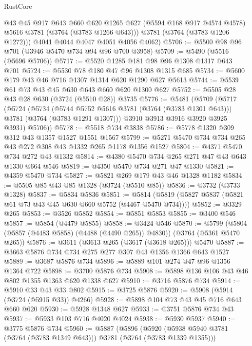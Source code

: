 \begin{lexlean}{RustCore}
\begin{coremodule}
          @43
          @45
          @917
          @643
          @660
          @620
          @1265
          @627
          (@5594 @168 @917 @4574 @4578)
          @5616
          @3781
          (@3764 (@3783 @1266 @643)))
        @3781
        (@3764 (@3783 @1206 @1272)))
      @4041
      @4044
      @4047
      @4051
      @4056
      @4062)
@5706 := @5500 @98 @96 @701 (@3946 @5470 @734 @94 @96 @700 @3958)
@5709 := @5490 (@5516 (@5696 @5706))
@5717 := @5520 @1285 @181 @98 @96 @1308 @1317 @643 @701
@5724 := @5530 @78 @180 @47 @96 @1308 @1315 @685
@5734 := @5600 @179 @43 @46 @716 @1307 @1314 @620 @1290 @627 @5613
@5744 := @5539 @61 @73 @43 @45 @630 @643 @660 @620 @1300 @627
@5752 := @5505 @28 @43 @28 @630 (@3724 (@5510 @28)) @3735
@5776 := @5481
    (@5709
      (@5717
        (@5724
          (@5734
            (@5744 @5752 @5616 @3781 (@3764 (@3783 @1301 @643)))
            @3781
            (@3764 (@3783 @1291 @1307)))
          @3910
          @3913
          @3916
          @3920
          @3925
          @3931)
        @5706))
@5778 := @5518 @734 @3838
@5786 := @5778 @1320 @309 @312 @43 @1357 @1527 @1551 @1567
@5799 := @5271 @5470 @734 @734 @265 @43 @272 @308 @43 @1332 @265 @1178 @1356 @1527
@5804 := @4371 @5470 @734 @272 @43 @1332
@5814 := @4380 @5470 @734 @265 @271 @47 @43 @643 @1330 @664 @546
@5819 := @4350 @5470 @734 @271 @47 @1330
@5821 := @4359 @5470 @734
@5827 := @5821 @269 @179 @43 @46 @1328 @1182
@5834 := @5505 @85 @43 @85 @1328 (@3724 (@5510 @85))
@5836 := @3732 (@3733 @1328)
@5837 := @5834 @5836
@5851 := @5814 (@5819 (@5827 @5837 (@5821 @61 @73 @43 @45 @630 @660 @5752 (@4467 @5470 @734))))
@5852 := @3329 @265
@5853 := @3526 @5852
@5854 := @5851 @5853
@5855 := @3400 @546
@5857 := @5854 (@4479 @5855)
@5858 := @3424 @546
@5870 := @5799 (@5804 (@5857 (@4483 @5858) (@4488 (@4490 @265)) @4830)) (@3764 (@5361 @5470 @265))
@5876 := @3611 (@3613 @265 (@3617 (@3618 @265))) @5470
@5887 := @3663 @5876 @734 @734 @275 @277 @307 @43 @1356 @1366 @643 @1527
@5889 := @3687 @5876 @734
@5896 := @5889 @101 @274 @47 @96 @1356 @1364 @722
@5898 := @3700 @5876 @734
@5908 := @5898 @136 @106 @43 @46 @802 @1355 @1363 @620 @1338 @627
@5910 := @3716 @5876 @734
@5914 := @5910 @33 @43 @33 @802
@5915 := @3725 @5876
@5920 := @5908 (@5914 (@3724 (@5915 @33)) @4266)
@5928 := @5898 @104 @73 @43 @45 @716 @643 @660 @620
@5930 := @5928 @1348 @627
@5933 := @3751 @5876 @734 @43
@5937 := @5933 @103 @716 @4020 @4024
@5938 := @5930 @5937
@5940 := @3775 @5876 @734
@5960 := @5887
    (@5896
      (@5920 (@5938 @5940 @3781 (@3764 (@3783 @1349 @643))) @3781 (@3764 (@3783 @1339 @1355)))

\end{coremodule}
\end{lexlean}
